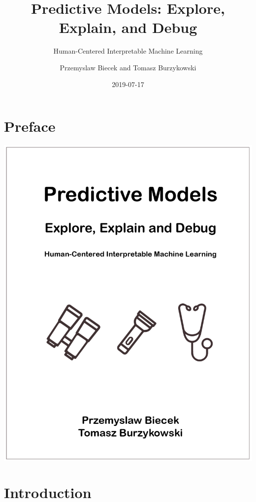 \documentclass[12pt,]{krantz}
\title{Predictive Models: Explore, Explain, and Debug}
\subtitle{Human-Centered Interpretable Machine Learning}
\author{Przemyslaw Biecek and Tomasz Burzykowski}
\date{2019-07-17}
\theoremstyle{definition}
\theoremstyle{definition}
\theoremstyle{definition}
\theoremstyle{remark}
\begin{document}
\maketitle

{
\hypersetup{linkcolor=black}
\setcounter{tocdepth}{2}
\tableofcontents
}
\listoftables
\listoffigures
\hypertarget{preface}{%
\section*{Preface}\label{preface}}

\begin{center}\includegraphics[width=0.99\linewidth]{figure/front} \end{center}

\hypertarget{introduction}{%
\section{Introduction}\label{introduction}}
\end{document}
